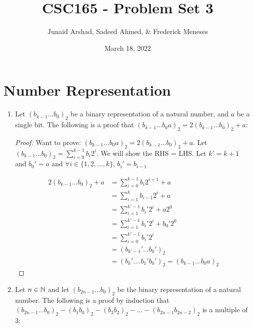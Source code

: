 \documentclass[12pt]{article}
\title{CSC165 - Problem Set 3}
\author{Junaid Arshad, Sadeed Ahmed, \& Frederick Meneses}
\date{March 18, 2022}
\theoremstyle{definition}
\begin{document}
\maketitle
\section{Number Representation}

\begin{enumerate}

    \item Let $(b_{k-1}\dots b_0)_2$ be a binary representation of a natural number, and $a$ be a single bit. The following is a proof that $(b_{k-1}\dots b_0 a)_2 = 2(b_{k-1}\dots b_0)_2 + a$:
    
        \begin{proof}
            Want to prove: $(b_{k-1}\ldots b_0a)_2 = 2(b_{k-1}\ldots b_0)_2 + a$.
            Let $(b_{k-1}\ldots b_0)_2 = \sum_{i=0}^{k-1}b_i2^i$.
            We will show the RHS = LHS.
            Let $k' = k + 1$ and $b_0' = a$ and $\forall i \in \{1,2,\ldots,k\}$, $b_i' = b_{i-1}$
            
            \begin{align*}
                2(b_{k-1}\ldots b_0)_2 + a &= \sum_{i=0}^{k-1}b_i2^{i+1} + a \\
                &= \sum_{i=1}^{k}b_{i-1}2^{i} + a \\
                &= \sum_{i=1}^{k'-1}b_{i}'2^{i} + a2^0 \tag{$2^0 = 1$}\\
                &= \sum_{i=1}^{k'-1}b_{i}'2^{i} + b_0'2^0 \tag{$b_0' = a$}\\
                &= \sum_{i=0}^{k'-1}b_{i}'2^{i} \\
                &= (b_{k'-1}'...b_0')_2 \\ 
                &= (b_{k}'....b_{1}'b_{0}')_2 = (b_{k-1}\ldots b_0a)_2
            \end{align*}
            
        \end{proof}
    
    \item Let $n \in \mathbb N$ and let $(b_{2n-1}\dots b_0)_2$ be the binary representation of a natural number. The following is a proof by induction that $(b_{2n-1}\dots b_0)_2 - (b_1 b_0)_2 - (b_3 b_2)_2 - \dots - (b_{2n-1} b_{2n-2})_2$ is a multiple of 3:
        

\end{enumerate}
\end{document}
